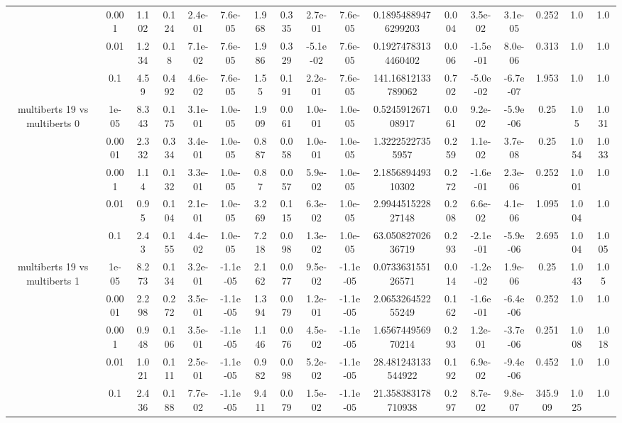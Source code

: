 \begin{tabular}{|c|c|c|c|c|c|c|c|c|c|c|c|c|c|c|c|c|}
 & 0.001 & 1.102 & 0.124 & 2.4e-01 & 7.6e-05 & 1.968 & 0.335 & 2.7e-01 & 7.6e-05 & 0.18954889476299203 & 0.004 & 3.5e-02 & 3.1e-05 & 0.252 & 1.0 & 1.0 \\
 & 0.01 & 1.234 & 0.18 & 7.1e-02 & 7.6e-05 & 1.986 & 0.329 & -5.1e-02 & 7.6e-05 & 0.19274783134460402 & 0.006 & -1.5e-01 & 8.0e-06 & 0.313 & 1.0 & 1.0 \\
 & 0.1 & 4.59 & 0.492 & 4.6e-02 & 7.6e-05 & 1.55 & 0.191 & 2.2e-01 & 7.6e-05 & 141.16812133789062 & 0.702 & -5.0e-02 & -6.7e-07 & 1.953 & 1.0 & 1.0 \\
\hline
\multirow{5}{*}{multiberts 19 vs multiberts 0} & 1e-05 & 8.343 & 0.175 & 3.1e-01 & 1.0e-05 & 1.909 & 0.061 & 1.0e-01 & 1.0e-05 & 0.524591267108917 & 0.061 & 9.2e-02 & -5.9e-06 & 0.25 & 1.05 & 1.031 \\
 & 0.0001 & 2.332 & 0.334 & 3.4e-01 & 1.0e-05 & 0.887 & 0.058 & 1.0e-01 & 1.0e-05 & 1.32225227355957 & 0.259 & 1.1e-02 & 3.7e-08 & 0.25 & 1.054 & 1.033 \\
 & 0.001 & 1.14 & 0.132 & 3.3e-01 & 1.0e-05 & 0.87 & 0.057 & 5.9e-02 & 1.0e-05 & 2.185689449310302 & 0.272 & -1.6e-01 & 2.3e-06 & 0.252 & 1.001 & 1.0 \\
 & 0.01 & 0.95 & 0.104 & 2.1e-01 & 1.0e-05 & 3.269 & 0.115 & 6.3e-02 & 1.0e-05 & 2.994451522827148 & 0.208 & 6.6e-02 & 4.1e-06 & 1.095 & 1.004 & 1.0 \\
 & 0.1 & 2.43 & 0.155 & 4.4e-02 & 1.0e-05 & 7.218 & 0.098 & 1.3e-02 & 1.0e-05 & 63.05082702636719 & 0.293 & -2.1e-01 & -5.9e-06 & 2.695 & 1.004 & 1.005 \\
\hline
\multirow{5}{*}{multiberts 19 vs multiberts 1} & 1e-05 & 8.273 & 0.134 & 3.2e-01 & -1.1e-05 & 2.162 & 0.077 & 9.5e-02 & -1.1e-05 & 0.073363155126571 & 0.014 & -1.2e-02 & 1.9e-06 & 0.25 & 1.043 & 1.05 \\
 & 0.0001 & 2.298 & 0.272 & 3.5e-01 & -1.1e-05 & 1.394 & 0.079 & 1.2e-01 & -1.1e-05 & 2.065326452255249 & 0.162 & -1.6e-01 & -6.4e-06 & 0.252 & 1.0 & 1.0 \\
 & 0.001 & 0.948 & 0.106 & 3.5e-01 & -1.1e-05 & 1.146 & 0.076 & 4.5e-02 & -1.1e-05 & 1.656744956970214 & 0.293 & 1.2e-01 & -3.7e-06 & 0.251 & 1.008 & 1.018 \\
 & 0.01 & 1.021 & 0.111 & 2.5e-01 & -1.1e-05 & 0.982 & 0.098 & 5.2e-02 & -1.1e-05 & 28.481243133544922 & 0.192 & 6.9e-02 & -9.4e-06 & 0.452 & 1.0 & 1.0 \\
 & 0.1 & 2.436 & 0.188 & 7.7e-02 & -1.1e-05 & 9.411 & 0.079 & 1.5e-02 & -1.1e-05 & 21.358383178710938 & 0.297 & 8.7e-02 & 9.8e-07 & 345.909 & 1.025 & 1.0 \\

\end{tabular}
